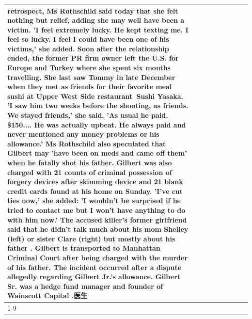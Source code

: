 \begin{table}[H]
\begin{tabular}{lllrlllll}
retrospect, Ms Rothschild said today that she felt nothing but relief, adding she may well have been a victim. 'I feel extremely lucky. He kept texting me. I feel so lucky. I feel I could have been one of his victims,' she added. Soon after the relationship ended, the former PR firm owner left the U.S. for Europe and Turkey where she spent six months  travelling. She last saw Tommy in late December when they met as friends for their favorite meal sushi at Upper West Side restaurant Sushi Yasaka. 'I saw him two weeks before the shooting, as friends. We stayed friends,' she said. 'As usual he paid. \$150.... He was actually upbeat. He always paid and never mentioned any money problems or his allowance.' Ms Rothschild also speculated that Gilbert may 'have been on meds and came off them' when he fatally shot his father. Gilbert was also charged with 21 counts of criminal possession of forgery devices after skimming device and 21 blank credit cards found at his home on Sunday. 'I've cut ties now,' she added: 'I wouldn’t be surprised if he tried to contact me but I won’t have anything to do with him now.' The accused killer's former girlfriend said that he didn't talk much about his mom Shelley (left) or sister Clare (right) but mostly about his father . Gilbert is transported to Manhattan Criminal Court  after being charged with the murder of his father. The incident occurred after a dispute allegedly regarding Gilbert Jr.'s allowance. Gilbert Sr. was a hedge fund manager and founder of Wainscott Capital .医生 \\
\cline{1-9} \cline{2-9}

\end{tabular}
\end{table}

